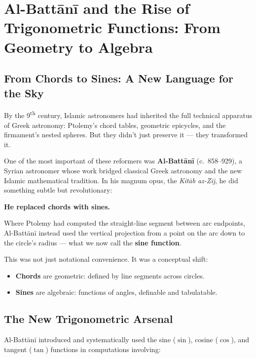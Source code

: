 \section{Al-Battānī and the Rise of Trigonometric Functions: From Geometry to Algebra}

\subsection{From Chords to Sines: A New Language for the Sky}

By the 9\textsuperscript{th} century, Islamic astronomers had inherited the full technical apparatus of Greek astronomy: Ptolemy’s chord tables, geometric epicycles, and the firmament's nested spheres. But they didn’t just preserve it — they transformed it.

One of the most important of these reformers was \textbf{Al-Battānī} (c.~858–929), a Syrian astronomer whose work bridged classical Greek astronomy and the new Islamic mathematical tradition. In his magnum opus, the \textit{Kitāb az-Zīj}, he did something subtle but revolutionary:

\begin{center}
\textbf{He replaced chords with sines.}
\end{center}

\medskip

Where Ptolemy had computed the straight-line segment between arc endpoints, Al-Battānī instead used the vertical projection from a point on the arc down to the circle’s radius — what we now call the \textbf{sine function}.

\medskip

This was not just notational convenience. It was a conceptual shift:

\begin{itemize}
    \item \textbf{Chords} are geometric: defined by line segments across circles.
    \item \textbf{Sines} are algebraic: functions of angles, definable and tabulatable.
\end{itemize}

\subsection{The New Trigonometric Arsenal}

Al-Battānī introduced and systematically used the sine (\( \sin \)), cosine (\( \cos \)), and tangent (\( \tan \)) functions in computations involving:

